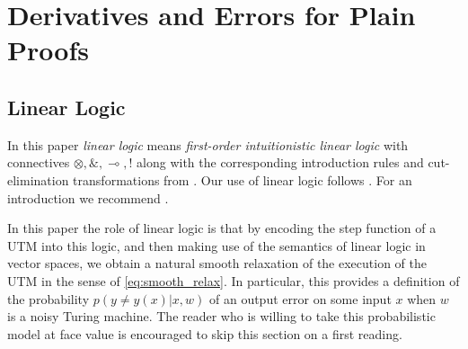 \documentclass[english,letter paper,12pt,reqno]{article}
\theoremstyle{definition}
\begin{document}
\section{Derivatives and Errors for Plain Proofs}\label{section:derivatives_errors}

\subsection{Linear Logic}\label{section:linear_logic_setup}

In this paper \emph{linear logic} means \emph{first-order intuitionistic linear logic} with connectives $\otimes, \&, \multimap, !$ along with the corresponding introduction rules and cut-elimination transformations from \cite{mellies2009categorical, Benten}. Our use of linear logic follows \cite{clift2020cofree, clift2020encodings, clift2018derivatives}. For an introduction we recommend \cite{girard1987linear, mellies2009categorical, murfet2014logic}.

In this paper the role of linear logic is that by encoding the step function of a UTM into this logic, and then making use of the semantics of linear logic in vector spaces, we obtain a natural smooth relaxation of the execution of the UTM in the sense of \eqref{eq:smooth_relax}. In particular, this provides a definition of the probability $p(y \neq y(x)|x,w)$ of an output error on some input $x$ when $w$ is a noisy Turing machine. The reader who is willing to take this probabilistic model at face value is encouraged to skip this section on a first reading.
\\
\end{document}
